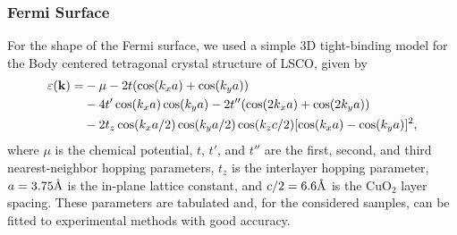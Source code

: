 \subsubsection{Fermi Surface}
For the shape of the Fermi surface, we used a simple 3D tight-binding model for the Body centered
tetragonal crystal structure of LSCO, given by
\begin{equation}
\begin{aligned}
    \varepsilon(\vb{k}) = &-\mu - 2t(\cos(k_x a) + \cos(k_y a)) \\
        &- 4t'\cos(k_x a)\cos(k_y a) - 2t''(\cos(2k_x a) + \cos(2k_y a)) \\
        &- 2t_z\cos(k_x a / 2)\cos(k_y a / 2)\cos(k_z c / 2)[\cos(k_x a) - \cos(k_y a)]^2,
\end{aligned}
\end{equation}
where $\mu$ is the chemical potential, $t$, $t'$, and $t''$ are the first, second, and third
nearest-neighbor hopping parameters, $t_z$ is the interlayer hopping parameter,
$a=3.75\textup{\AA}$ is the in-plane lattice constant, and $c/2=6.6\textup{\AA}$ is the
$\mathrm{CuO_2}$ layer spacing. These parameters are tabulated and, for the considered samples,
can be fitted to experimental methods with good accuracy. 
